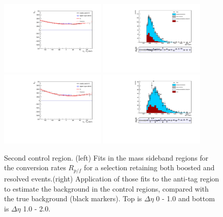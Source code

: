 \begin{figure}[h]
\centering
\includegraphics[width=0.45\textwidth]{F5/HH4b2p1SR_Fit_BG_retain_dEta0_CR2.pdf}
\includegraphics[width=0.45\textwidth]{F5/HH4b2p1_Plot_BG_retain_dEta0_CR2.pdf}\\
\includegraphics[width=0.45\textwidth]{F5/HH4b2p1SR_Fit_BG_retain_dEta1_CR2.pdf}
\includegraphics[width=0.45\textwidth]{F5/HH4b2p1_Plot_BG_retain_dEta1_CR2.pdf}
\caption{Second control region. (left) Fits in the mass sideband regions for the conversion rates $R_{p/f}$ for a selection retaining both boosted and resolved events.(right) Application of those fits to the anti-tag region to estimate the background in the control regions, compared with the true background (black markers). Top is $\Delta\eta$ 0 - 1.0 and bottom is $\Delta\eta$ 1.0 - 2.0.}
\label{fig:closuredata2}
\end{figure}

